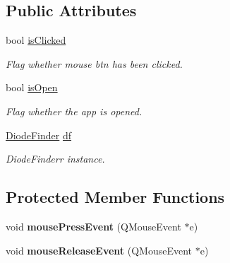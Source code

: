 \subsection*{\-Public \-Attributes}
\begin{DoxyCompactItemize}
\item 
\hypertarget{classMainWindow_a88b80185c823c931613bd3dc6d219742}{bool \hyperlink{classMainWindow_a88b80185c823c931613bd3dc6d219742}{is\-Clicked}}\label{classMainWindow_a88b80185c823c931613bd3dc6d219742}

\begin{DoxyCompactList}\small\item\em \-Flag whether mouse btn has been clicked. \end{DoxyCompactList}\item 
\hypertarget{classMainWindow_aae4fff279e83f91d137c24e08b5c7902}{bool \hyperlink{classMainWindow_aae4fff279e83f91d137c24e08b5c7902}{is\-Open}}\label{classMainWindow_aae4fff279e83f91d137c24e08b5c7902}

\begin{DoxyCompactList}\small\item\em \-Flag whether the app is opened. \end{DoxyCompactList}\item 
\hypertarget{classMainWindow_a95b84bb00b1659374e4a965984bdfddc}{\hyperlink{classDiodeFinder}{\-Diode\-Finder} \hyperlink{classMainWindow_a95b84bb00b1659374e4a965984bdfddc}{df}}\label{classMainWindow_a95b84bb00b1659374e4a965984bdfddc}

\begin{DoxyCompactList}\small\item\em \-Diode\-Finderr instance. \end{DoxyCompactList}\end{DoxyCompactItemize}
\subsection*{\-Protected \-Member \-Functions}
\begin{DoxyCompactItemize}
\item 
\hypertarget{classMainWindow_aed2bdf63a7640182adfd5e959ea672d2}{void {\bfseries mouse\-Press\-Event} (\-Q\-Mouse\-Event $\ast$e)}\label{classMainWindow_aed2bdf63a7640182adfd5e959ea672d2}

\item 
\hypertarget{classMainWindow_a16379582183ef9c2e9f616fc82c7b3d1}{void {\bfseries mouse\-Release\-Event} (\-Q\-Mouse\-Event $\ast$e)}\label{classMainWindow_a16379582183ef9c2e9f616fc82c7b3d1}

\end{DoxyCompactItemize}


